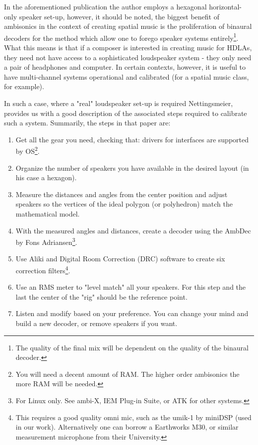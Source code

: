 In the aforementioned publication the author employs a hexagonal horizontal-only speaker set-up, however, it should be noted, the biggest benefit of ambisonics in the context of creating spatial music is the proliferation of binaural decoders for the method which allow one to forego speaker systems entirely\footnote{The quality of the final mix will be dependent on the quality of the binaural decoder.}. What this means is that if a composer is interested in creating music for HDLAs, they need not have access to a sophisticated loudspeaker system - they only need a pair of headphones and computer. In certain contexts, however, it is useful to have multi-channel systems operational and calibrated (for a spatial music class, for example). 

In such a case, where a "real" loudspeaker set-up is required Nettingsmeier, provides us with a good description of the associated steps required to calibrate such a system. Summarily, the steps in that paper are:

\begin{enumerate}
    \item Get all the gear you need, checking that: drivers for interfaces are supported by OS\footnote{You will need a decent amount of RAM. The higher order ambisonics the more RAM will be needed.}.
    \item Organize the number of speakers you have available in the desired layout (in his case a hexagon). 
    \item Measure the distances and angles from the center position and adjust speakers so the vertices of the ideal polygon (or polyhedron) match the mathematical model.  
    \item With the measured angles and distances, create a decoder using the AmbDec by Fons Adriansen\footnote{For Linux only. See ambi-X, IEM Plug-in Suite, or ATK for other systems.}.
    \item Use Aliki and Digital Room Correction (DRC) software to create six correction filters\footnote{This requires a good quality omni mic, such as the umik-1 by miniDSP (used in our work). Alternatively one can borrow a Earthworks M30, or similar measurement microphone from their University.}.
    \item Use an RMS meter to "level match" all your speakers. For this step and the last the center of the "rig" should be the reference point. 
    \item Listen and modify based on your preference. You can change your mind and build a new decoder, or remove speakers if you want. 
\end{enumerate}

